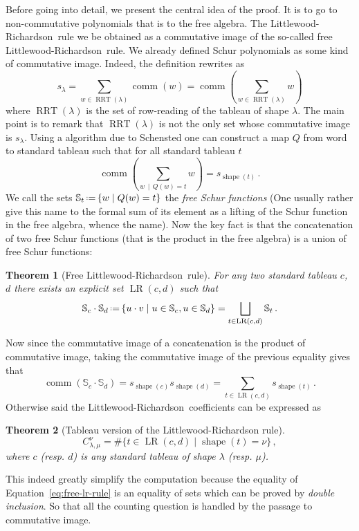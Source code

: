 \documentclass[12pt]{article}
\newcommand{\LR}{Littlewood-Richardson\ }
\newcommand{\comm}{\operatorname{comm}}
\newcommand{\freeS}{{\mathbb S}}
\newcommand{\shape}{\operatorname{shape}}
\newcommand{\eqdef}{\mbox{\,\raisebox{0.2ex}{\scriptsize\ensuremath{\mathrm:}}\ensuremath{=}\,}} %
\newtheorem{THEO}{Theorem}
\begin{document}
Before going into detail, we present the central idea of the proof. It is to
go to non-commutative polynomials that is to the free algebra. The \LR rule we
be obtained as a commutative image of the so-called free \LR rule. We already
defined Schur polynomials as some kind of commutative image. Indeed, the
definition rewrites as
\begin{equation}
  s_\lambda = \sum_{w \in \operatorname{RRT}(\lambda)}
  \comm(w) = \comm\left(\sum_{w \in \operatorname{RRT}(\lambda)} w\right)
\end{equation}
where $\operatorname{RRT}(\lambda)$ is the set of row-reading of the tableau
of shape $\lambda$. The main point is to remark that
$\operatorname{RRT}(\lambda)$ is not the only set whose commutative image is
$s_\lambda$. Using a algorithm due to Schensted one can construct a map $Q$
from word to standard tableau such that for all standard tableau $t$
\begin{equation}
  \comm\left(\sum_{w\, \mid\, Q(w)=t} w\right) = s_{\shape(t)}\,.
\end{equation}
We call the sets $\freeS_t\eqdef\{w \mid Q(w)=t\}$ the \emph{free Schur
  functions} (One usually rather give this name to the formal sum of its
element as a lifting of the Schur function in the free algebra, whence the
name).  Now the key fact is that the concatenation of two free Schur functions
(that is the product in the free algebra) is a union of free Schur functions:
\begin{THEO}[Free \LR rule]\label{theo:free-LR_rule}
  For any two standard tableau $c$, $d$ there exists an explicit set
  $\operatorname{LR}(c, d)$ such that
  \begin{equation}
    \label{eq:free-lr-rule}
    \freeS_c\cdot\freeS_d\eqdef\{ u\cdot v \mid u\in \freeS_c, u\in \freeS_d \} =
    \bigsqcup_{t\in\operatorname{LR}(c, d)} \freeS_t\,.
  \end{equation}
\end{THEO}
Now since the commutative image of a concatenation is the product of
commutative image, taking the commutative image of the previous equality gives that
\begin{equation}
  \comm(\freeS_c\cdot\freeS_d) = s_{\shape(c)}s_{\shape(d)} =
  \sum_{t\in\operatorname{LR}(c, d)} s_{\shape(t)}\,.
\end{equation}
Otherwise said the \LR coefficients can be expressed as
\begin{THEO}[Tableau version of the Littlewood-Richardson rule]
  \begin{equation}
    C_{\lambda,\mu}^{\nu} = \#\{t\in\operatorname{LR}(c, d) \mid \shape(t) = \nu\}\,,
  \end{equation}
  where $c$ (resp. $d$) is any standard tableau of shape $\lambda$
  (resp. $\mu$).
\end{THEO}
This indeed greatly simplify the computation because the equality of
Equation~\ref{eq:free-lr-rule} is an equality of sets which can be proved by
\emph{double inclusion}. So that all the counting question is handled by the passage
to commutative image.
\end{document}
